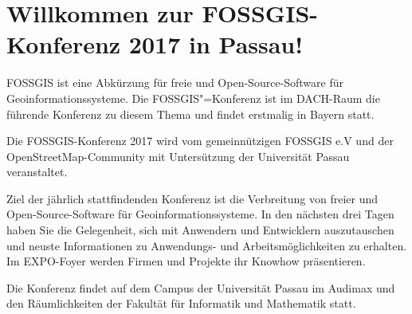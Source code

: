 \newpage
\section*{Willkommen zur FOSSGIS-Konferenz 2017 in Passau!} \label{welcome}
FOSSGIS ist eine Abkürzung für freie und Open-Source-Software für Geoinformationssysteme.
Die FOSSGIS"=Konferenz ist im DACH-Raum die führende Konferenz zu diesem Thema und findet erstmalig
in Bayern statt.

Die FOSSGIS-Konferenz 2017 wird vom gemeinnützigen FOSSGIS e.V und der OpenStreetMap-Community
mit Untersützung der Universität Passau veranstaltet.

Ziel der jährlich stattfindenden Konferenz ist die Verbreitung von freier und Open-Source-Software
für Geoinformationssysteme.  In den nächsten drei Tagen haben Sie die Gelegenheit, sich mit
Anwendern und Entwicklern auszutauschen
und neuste Informationen zu An\-wen\-dungs- und Arbeitsmöglichkeiten zu erhalten. Im EXPO-Foyer
werden Firmen und Projekte ihr Know\-how präsentieren.

Die Konferenz findet auf dem Campus der Universität Passau im Audimax und den Räumlichkeiten der
Fakultät für Informatik und Mathematik statt.

\newpage

